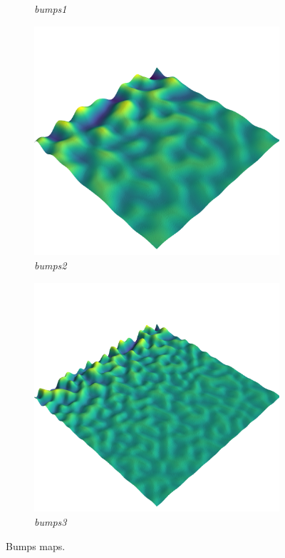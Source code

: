 \documentclass[../document.tex]{subfiles}
\begin{document}
\begin{figure}[H]
\begin{subfigure}[b]{0.32\linewidth}
            \caption{\emph{bumps1}}
            \end{subfigure}    
          \begin{subfigure}[b]{0.32\textwidth}
            \includegraphics[width=\textwidth]{../img/hm3d/bumps2.png}
            \caption{\emph{bumps2}}
        \end{subfigure}    
        \begin{subfigure}[b]{0.32\textwidth}
            \includegraphics[width=\textwidth]{../img/hm3d/bumps3.png}
            \caption{\emph{bumps3}}
        \end{subfigure}    
    \label{fig: heightmaps}
    \caption{Bumps maps.}
\end{figure}
\end{document}
